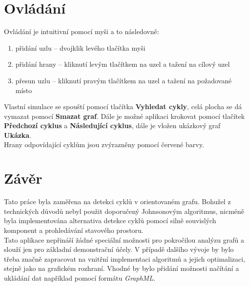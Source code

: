 \documentclass[11pt]{article}
\begin{document}
\section{Ovládání}
Ovládání je intuitivní pomocí myši a to následovně:
\begin{enumerate}
	\item přidání uzlu -- dvojklik levého tlačítka myši
	\item přidání hrany -- kliknutí levým tlačítkem na uzel a tažení na cílový uzel
	\item přesun uzlu -- kliknutí pravým tlačítkem na uzel a tažení na požadované místo  
\end{enumerate}
Vlastní simulace se spouští pomocí tlačítka \textbf{Vyhledat cykly}, celá plocha se dá vymazat pomocí \textbf{Smazat graf}. Dále je možné aplikaci krokovat pomocí tlačítek \textbf{Předchozí cyklus} a \textbf{Následující cyklus}, dále je vložen ukázkový graf \textbf{Ukázka}.\\
Hrany odpovídající cyklům jsou zvýrazněny pomocí červené barvy.
\section{Závěr}
Tato práce byla zaměřena na detekci cyklů v orientovaném grafu. Bohužel z technických důvodů nebyl použit doporučený Johnsonovým algoritmus, nicméně byla implementována alternativa detekce cyklů pomocí silně souvislých komponent a prohledávání stavového prostoru.\\ Tato aplikace nepřináší žádné speciální možnosti pro pokročilou analýzu grafů a slouží jen pro základní demonstrační účely. V případě dalšího vývoje by bylo třeba značně zapracovat na vnitřní implementaci algoritmů a jejich optimalizaci, stejně jako na grafickém rozhraní. Vhodné by bylo přidání možnosti načítání a ukládání dat například pomocí formátu \textit{GraphML}.
\newpage

\end{document}
